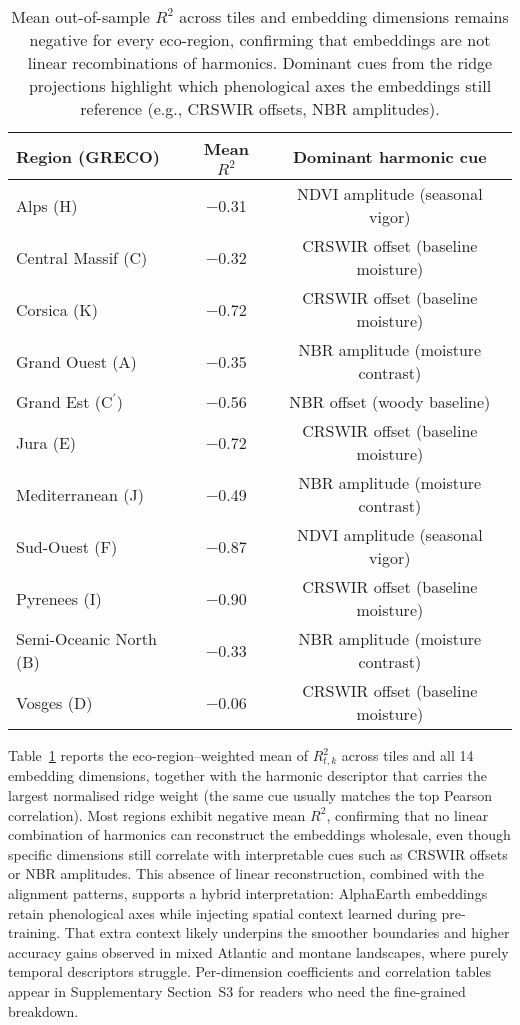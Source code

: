 \documentclass[utf8]{FrontiersinHarvard}
\begin{document}
\begin{table}[H]
    \centering
    \small
    \begin{tabular}{lcc}
        \toprule
        \textbf{Region (GRECO)} & \textbf{Mean $R^2$} & \textbf{Dominant harmonic cue} \\
        \midrule
        Alps (H) & −0.31 & NDVI amplitude (seasonal vigor) \\
        Central Massif (C) & −0.32 & CRSWIR offset (baseline moisture) \\
        Corsica (K) & −0.72 & CRSWIR offset (baseline moisture) \\
        Grand Ouest (A) & −0.35 & NBR amplitude (moisture contrast) \\
        Grand Est (C$^\prime$) & −0.56 & NBR offset (woody baseline) \\
        Jura (E) & −0.72 & CRSWIR offset (baseline moisture) \\
        Mediterranean (J) & −0.49 & NBR amplitude (moisture contrast) \\
        Sud-Ouest (F) & −0.87 & NDVI amplitude (seasonal vigor) \\
        Pyrenees (I) & −0.90 & CRSWIR offset (baseline moisture) \\
        Semi-Oceanic North (B) & −0.33 & NBR amplitude (moisture contrast) \\
        Vosges (D) & −0.06 & CRSWIR offset (baseline moisture) \\
        \bottomrule
    \end{tabular}
    \caption{Mean out-of-sample $R^2$ across tiles and embedding dimensions remains negative for every eco-region, confirming that embeddings are not linear recombinations of harmonics. Dominant cues from the ridge projections highlight which phenological axes the embeddings still reference (e.g., CRSWIR offsets, NBR amplitudes).}
    \label{tab:similarity_summary}
\end{table}

Table~\ref{tab:similarity_summary} reports the eco-region–weighted mean of \(R^2_{t,k}\) across tiles and all 14 embedding dimensions, together with the harmonic descriptor that carries the largest normalised ridge weight (the same cue usually matches the top Pearson correlation). Most regions exhibit negative mean $R^2$, confirming that no linear combination of harmonics can reconstruct the embeddings wholesale, even though specific dimensions still correlate with interpretable cues such as CRSWIR offsets or NBR amplitudes. This absence of linear reconstruction, combined with the alignment patterns, supports a hybrid interpretation: AlphaEarth embeddings retain phenological axes while injecting spatial context learned during pre-training. That extra context likely underpins the smoother boundaries and higher accuracy gains observed in mixed Atlantic and montane landscapes, where purely temporal descriptors struggle. Per-dimension coefficients and correlation tables appear in Supplementary Section~S3 for readers who need the fine-grained breakdown.
\end{document}
